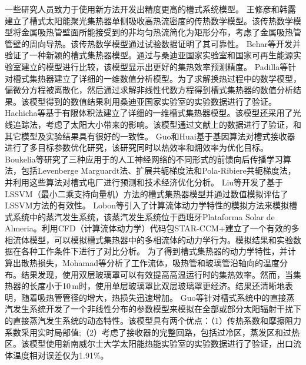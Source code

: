 一些研究人员致力于使用新方法开发出精度更高的槽式系统模型。
王修彦和韩露\cite{Wang2017a}建立了槽式太阳能聚光集热器单侧吸收高热流密度的传热数学模型。该传热数学模型将金属吸热管壁面所能接受到的非均匀热流简化为矩形分布，考虑了金属吸热管管壁的周向导热。该传热数学模型通过试验数据证明了其可靠性。
Behar等\cite{Behar2015}开发并验证了一种新颖的槽式集热器模型。通过与桑迪亚国家实验室和国家可再生能源实验室建立的模型进行比较，该模型显示出更好的集热效率预测精度。
Padilla等\cite{Padilla2011}针对槽式集热器建立了详细的一维数值分析模型。为了求解换热过程中的数学模型，偏微分方程被离散化，然后通过求解非线性代数方程得到槽式集热器的数值分析结果。该模型得到的数值结果利用桑迪亚国家实验室的实验数据进行了验证。
Hachicha等\cite{Hachicha2013}基于有限体积法建立了详细的一维槽式集热器模型。该模型还采用了光线追踪法，考虑了太阳大小带来的影响。该模型通过文献上的数据进行了验证，和其它模型及实验结果具有很好的一致性。
Guo和Huai\cite{JiangfengGuo2016-2}基于基因算法对槽式接收器进行了多目标参数优化研究，该研究同时以热效率和㶲效率为优化目标。
Boukelia等\cite{Boukelia2016}研究了三种应用于的人工神经网络的不同形式的前馈向后传播学习算法，包括Levenberge Marguardt法、扩展共轭梯度法和Pola-Ribiere共轭梯度法，并利用这些算法对槽式电厂进行预测和技术经济优化分析。
Liu等\cite{Liu2012}开发了基于LSSVM（最小二乘支持向量机）方法的槽式集热器模型并通过数值模拟评估了LSSVM方法的有效性。
Lobon等\cite{Lobon2014}引入了计算流体动力学特性的模拟方法来模拟槽式系统中的蒸汽发生系统，该蒸汽发生系统位于西班牙Plataforma Solar de Almeria。利用CFD（计算流体动力学）代码包STAR-CCM+建立了一个有效的多相流体模型，可以模拟槽式集热器中的多相流体的动力学行为。模拟结果和实验数据在各种工作条件下进行了对比分析。
为了得到槽式集热器的动力学特性，并计算出散热损失，Mohamad等\cite{Mohamad2014}分析了工作流体，吸热管和玻璃管沿轴向的温度分布。结果发现，使用双层玻璃罩可以有效提高高温运行时的集热效率。然而，当集热器的长度小于10$\,\mathrm{m}$时，使用单层玻璃罩比双层玻璃罩更经济。结果还清晰地表明，随着吸热管管径的增大，热损失迅速增加。
Guo等\cite{SuGuo2016}针对槽式系统中的直接蒸汽发生系统开发了一个非线性分布的参数模型来模拟在全部或部分太阳辐射干扰下的直接蒸汽发生系统的动态特性。该模型具有两个优点：（1）传热系数和摩擦阻力系数采用实时局部值;（2）考虑了接收器的完整回路，包括过冷区，蒸发区和过热区。该模型使用新南威尔士大学太阳能热能实验室的实验数据进行了验证，出口流体温度相对误差仅为1.91\%。

